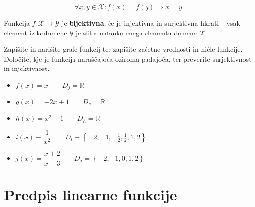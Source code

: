                 $$\forall x,y\in\mathcal{X}: f(x)=f(y)\Rightarrow x=y$$



            Funkcija $f:\mathcal{X}\to\mathcal{Y}$ je \textbf{bijektivna}, če je injektivna in surjektivna hkrati -- vsak element iz kodomene $\mathcal{Y}$ je slika natanko enega elementa domene $\mathcal{X}$.



            \begin{naloga}
                Zapišite in narišite grafe funkcij ter zapišite začetne vrednosti in ničle funkcije.
                Določite, kje je funkcija naraščajoča oziroma padajoča, ter preverite surjektivnost in injektivnost.
                    \begin{itemize}
                        \item $f(x)=x \quad \quad D_f=\mathbb{R}$ 
                        \item $g(x)=-2x+1 \quad \quad D_g=\mathbb{R}$ 
                        \item $h(x)=x^2-1 \quad \quad D_h=\mathbb{R}$ 
                        \item $i(x)=\dfrac{1}{x^2} \quad \quad D_i=\left\{-2, -1, -\frac{1}{2}, \frac{1}{2}, 1, 2\right\}$ 
                        \item $j(x)=\dfrac{x+2}{x-3} \quad \quad D_j=\left\{-2, -1, 0, 1, 2\right\}$ 
                    \end{itemize}
            \end{naloga}                    






\newpage


        \section{Predpis linearne funkcije}
        



